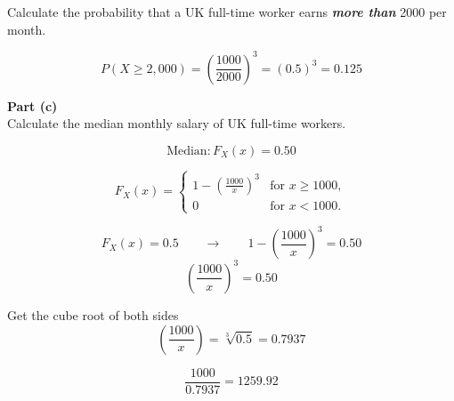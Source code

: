 \documentclass[a4paper,12pt]{article}
\begin{document}
\noindent Calculate the probability that a UK full-time worker earns \textit{\textbf{more than}} 2000 per month.

\[P(X \geq 2,000) =  \left(\frac{1000}{2000}\right)^3 = (0.5)^3 = 0.125 \]

\newpage 
\noindent \textbf{Part (c)}\\

\noindent Calculate the median monthly salary of UK full-time workers.

\[ \mbox{Median}: F_X(x) = 0.50\]

{

\[
F_X(x) = \begin{cases}
1-\left(\frac{1000}{x}\right)^3 & \mbox{for } x \ge 1000, \\
0 & \mbox{for }x < 1000.
\end{cases}
\]
}




\[ F_X(x) = 0.5 \qquad \rightarrow \qquad 1-\left(\frac{1000}{x}\right)^3 = 0.50\]
\[ \left(\frac{1000}{x}\right)^3 = 0.50\]

\noindent Get the cube root of both sides
\[ \left(\frac{1000}{x}\right) = \sqrt[3]{0.5} = 0.7937 \]



\[\frac{1000}{0.7937} = 1259.92\]
\end{document}
